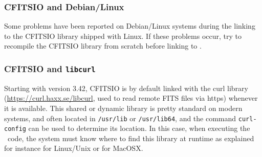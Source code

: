 \documentclass[12pt,twoside]{article}
\begin{document}
\subsubsection*{CFITSIO and Debian/Linux}
%
Some problems have been reported on Debian/Linux systems during the
linking to the CFITSIO library shipped with Linux. If these problems
occur, try to recompile the CFITSIO library from scratch before linking
to \healpix.

\subsubsection*{CFITSIO and \texttt{libcurl}}
\label{install:curl}
%
Starting with version 3.42, CFITSIO is by default linked with the 
curl library (\url{https://curl.haxx.se/libcurl},
used to read remote FITS files via https) whenever it is available.
This shared or dynamic library is pretty standard on modern systems, 
and often located in \texttt{/usr/lib} or \texttt{/usr/lib64}, and the command \texttt{curl-config} 
can be used to determine its location.
In this case, when executing the \healpix\ code, 
the system must know where to find this library at runtime as explained for instance 
for Linux/Unix or 
 for MacOSX.
\end{document}
